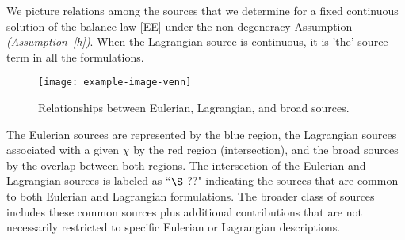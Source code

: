 \documentclass[12pt]{article}
\newcommand{\ass}[1]{\textit{(Assumption~\ref{#1})}}
\begin{document}
We picture relations among the sources that we determine for a fixed continuous solution of the balance law \eqref{EE} under the non-degeneracy Assumption \ass{h}. When the Lagrangian source is continuous, it is 'the' source term in all the formulations.

\begin{figure}
    \centering
    \texttt{[image: example-image-venn]}
    \caption{Relationships between Eulerian, Lagrangian, and broad sources.}
    \label{fig:source_relationships}
\end{figure}

The Eulerian sources are represented by the blue region, the Lagrangian sources associated with a given $\chi$ by the red region (intersection), and the broad sources by the overlap between both regions. The intersection of the Eulerian and Lagrangian sources is labeled as ``$\S$ ??" indicating the sources that are common to both Eulerian and Lagrangian formulations. The broader class of sources includes these common sources plus additional contributions that are not necessarily restricted to specific Eulerian or Lagrangian descriptions.
\end{document}

